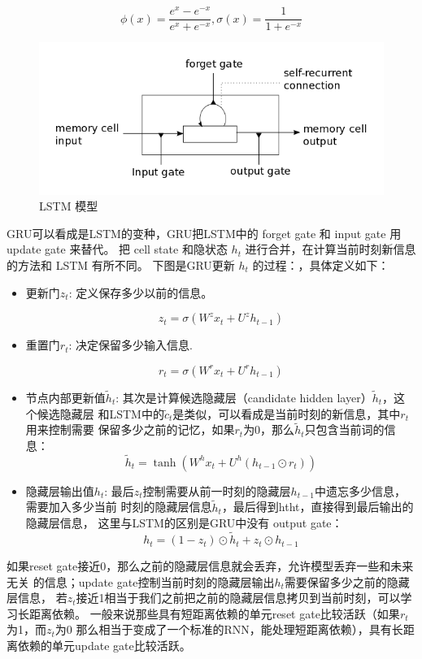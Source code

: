 \documentclass[12pt,a4paper]{article}
\begin{document}
\begin{equation}\label{equ:tanh}
  \phi(x)=\frac{e^x-e^{-x}}{e^x+e^{-x}},\sigma(x)=\frac{1}{1+e^{-x}}
\end{equation}

\begin{figure}
  \centering
  \includegraphics[width=0.7\linewidth]{./figures/lstm_memorycell.png}
  \caption{LSTM 模型}\label{fig:lstm}
\end{figure}


GRU可以看成是LSTM的变种，GRU把LSTM中的 forget gate 和 input gate 用 update gate 来替代。 把 cell state 和隐状态 $h_t$ 进行合并，在计算当前时刻新信息的方法和 LSTM 有所不同。 下图是GRU更新 $h_t$ 的过程：，具体定义如下：
\begin{itemize}
\item 更新门$z_t$: 定义保存多少以前的信息。

\[z_t = \sigma ( W^z x_t+ U^z h_{t-1}  )\]

\item 重置门$r_t$: 决定保留多少输入信息.

\[r_t = \sigma(W^r x_t  + U^r h_{t-1}  )\]

\item 节点内部更新值$\tilde h_t $: 其次是计算候选隐藏层（candidate hidden layer）$\tilde h_t$，这个候选隐藏层 和LSTM中的$\tilde c_t$是类似，可以看成是当前时刻的新信息，其中$r_t$用来控制需要 保留多少之前的记忆，如果$r_t$为0，那么$\tilde h_t$只包含当前词的信息：
 \[\tilde h_t  = \tanh (W^h x_t  + U^h(h_{t-1} \odot r_t) )\]

\item 隐藏层输出值$h_t$: 最后$z_t$控制需要从前一时刻的隐藏层$h_{t−1}$中遗忘多少信息，需要加入多少当前 时刻的隐藏层信息$\tilde h_t$，最后得到htht，直接得到最后输出的隐藏层信息， 这里与LSTM的区别是GRU中没有 output gate：
\[h_t = (1-z_t)\odot \tilde h_t  + z_t \odot h_{t-1}\]
\end{itemize}
如果reset gate接近0，那么之前的隐藏层信息就会丢弃，允许模型丢弃一些和未来无关 的信息；update gate控制当前时刻的隐藏层输出$h_t$需要保留多少之前的隐藏层信息， 若$z_t$接近1相当于我们之前把之前的隐藏层信息拷贝到当前时刻，可以学习长距离依赖。 一般来说那些具有短距离依赖的单元reset gate比较活跃（如果$r_t$为1，而$z_t$为0 那么相当于变成了一个标准的RNN，能处理短距离依赖），具有长距离依赖的单元update gate比较活跃。
\end{document}
